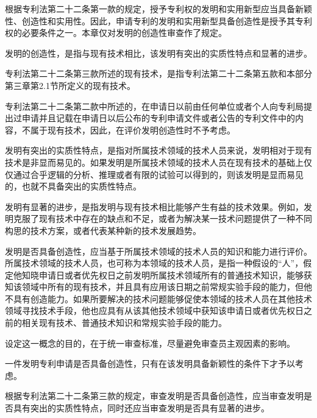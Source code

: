 根据专利法第二十二条第一款的规定，授予专利权的发明和实用新型应当具备新颖性、创造性和实用性。因此，申请专利的发明和实用新型具备创造性是授予其专利权的必要条件之一。本章仅对发明的创造性审查作了规定。

发明的创造性，是指与现有技术相比，该发明有突出的实质性特点和显著的进步。

专利法第二十二条第三款所述的现有技术，是指专利法第二十二条第五款和本部分第三章第2.1节所定义的现有技术。

专利法第二十二条第二款中所述的，在申请日以前由任何单位或者个人向专利局提出过申请并且记载在申请日以后公布的专利申请文件或者公告的专利文件中的内容，不属于现有技术，因此，在评价发明创造性时不予考虑。

发明有突出的实质性特点，是指对所属技术领域的技术人员来说，发明相对于现有技术是非显而易见的。如果发明是所属技术领域的技术人员在现有技术的基础上仅仅通过合乎逻辑的分析、推理或者有限的试验可以得到的，则该发明是显而易见的，也就不具备突出的实质性特点。

发明有显著的进步，是指发明与现有技术相比能够产生有益的技术效果。例如，发明克服了现有技术中存在的缺点和不足，或者为解决某一技术问题提供了一种不同构思的技术方案，或者代表某种新的技术发展趋势。

发明是否具备创造性，应当基于所属技术领域的技术人员的知识和能力进行评价。所属技术领域的技术人员，也可称为本领域的技术人员，是指一种假设的“人”，假定他知晓申请日或者优先权日之前发明所属技术领域所有的普通技术知识，能够获知该领域中所有的现有技术，并且具有应用该日期之前常规实验手段的能力，但他不具有创造能力。如果所要解决的技术问题能够促使本领域的技术人员在其他技术领域寻找技术手段，他也应具有从该其他技术领域中获知该申请日或者优先权日之前的相关现有技术、普通技术知识和常规实验手段的能力。

设定这一概念的目的，在于统一审查标准，尽量避免审查员主观因素的影响。

一件发明专利申请是否具备创造性，只有在该发明具备新颖性的条件下才予以考虑。

根据专利法第二十二条第三款的规定，审查发明是否具备创造性，应当审查发明是否具有突出的实质性特点，同时还应当审查发明是否具有显著的进步。

